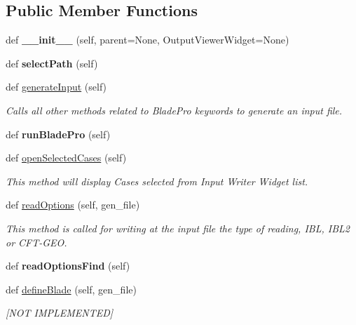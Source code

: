 \subsection*{Public Member Functions}
\begin{DoxyCompactItemize}
\item 
\hypertarget{a00073_a8b9718669dac6016ebe4e4f27421c7f2}{}\label{a00073_a8b9718669dac6016ebe4e4f27421c7f2} 
def {\bfseries \+\_\+\+\_\+init\+\_\+\+\_\+} (self, parent=None, Output\+Viewer\+Widget=None)
\item 
\hypertarget{a00073_a15eb2b878a78d644c96b19a5785d5428}{}\label{a00073_a15eb2b878a78d644c96b19a5785d5428} 
def {\bfseries select\+Path} (self)
\item 
def \hyperlink{a00073_a6ec74acbc44de3023188ddd8395b5b30}{generate\+Input} (self)
\begin{DoxyCompactList}\small\item\em Calls all other methods related to Blade\+Pro keywords to generate an input file. \end{DoxyCompactList}\item 
\hypertarget{a00073_a4f95b1c85e601bde79e5d4e1a526ef8b}{}\label{a00073_a4f95b1c85e601bde79e5d4e1a526ef8b} 
def {\bfseries run\+Blade\+Pro} (self)
\item 
def \hyperlink{a00073_af311095fe10adcca5237385033dfe67b}{open\+Selected\+Cases} (self)
\begin{DoxyCompactList}\small\item\em This method will display Cases selected from Input Writer Widget list. \end{DoxyCompactList}\item 
def \hyperlink{a00073_a7f4b3856d4dc973878dcbfd7697018bb}{read\+Options} (self, gen\+\_\+file)
\begin{DoxyCompactList}\small\item\em This method is called for writing at the input file the type of reading, I\+BL, I\+B\+L2 or C\+F\+T-\/\+G\+EO. \end{DoxyCompactList}\item 
\hypertarget{a00073_a3b0f9f0d1af5015219f258ad0751c778}{}\label{a00073_a3b0f9f0d1af5015219f258ad0751c778} 
def {\bfseries read\+Options\+Find} (self)
\item 
def \hyperlink{a00073_abf54bdb00a2743fb488463ab7247b146}{define\+Blade} (self, gen\+\_\+file)
\begin{DoxyCompactList}\small\item\em \mbox{[}N\+OT I\+M\+P\+L\+E\+M\+E\+N\+T\+ED\mbox{]} \end{DoxyCompactList}\item 

\end{DoxyCompactItemize}
